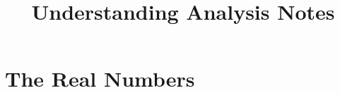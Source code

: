 \documentclass[a4paper]{book}
\title{Understanding Analysis Notes}
\begin{document}
\maketitle
\tableofcontents

\chapter{The Real Numbers}



% 

% 


% 

% 

% 

% 

% 

% 

% 


% 

% 

% 

% 


% 

% 

% 

% 
\end{document}
